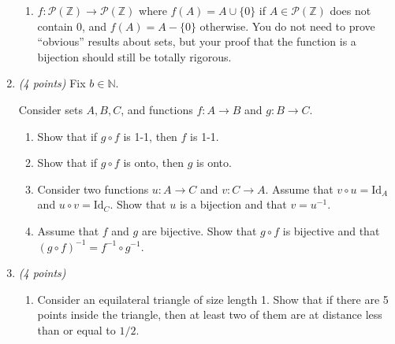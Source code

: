 \documentclass[12pt]{article}
\newcommand{\Id}{\mathrm{Id}} %
\begin{document}
\begin{enumerate}
\begin{enumerate}
\item \( f : \mathcal{P}(\mathbb{Z}) \to \mathcal{P}(\mathbb{Z}) \) where \( f(A) = A \cup \{ 0 \} \) if \( A \in \mathcal{P}(\mathbb{Z}) \) does not contain 0, and \( f(A) = A - \{ 0 \} \) otherwise. You do not need to prove ``obvious'' results about sets, but your proof that the function is a bijection should still be totally rigorous. \newline

\end{enumerate}


\item \emph{(4 points)} Fix \( b \in \mathbb{N} \).

Consider sets \( A, B, C \), and functions \( f : A \to B \) and \( g : B \to C \).

\begin{enumerate}
\item Show that if \( g \circ f \) is 1-1, then \( f \) is 1-1. \newline


\item Show that if \( g \circ f \) is onto, then \( g \) is onto. \newline


\item Consider two functions \( u : A \to C \) and \( v : C \to A \). Assume that \( v \circ u = \Id_A \) and \( u \circ v = \Id_C \). Show that \( u \) is a bijection and that \( v = u^{-1} \). \newline


\item Assume that \( f \) and \( g \) are bijective. Show that \( g \circ f \) is bijective and that \( (g \circ f)^{-1} = f^{-1} \circ g^{-1} \). \newline

\end{enumerate}



\item \emph{(4 points)} 

\begin{enumerate}
\item Consider an equilateral triangle of size length 1. Show that if there are 5 points inside the triangle, then at least two of them are at distance less than or equal to \( 1/2 \). \newline


\end{enumerate}
\end{enumerate}
\end{document}
